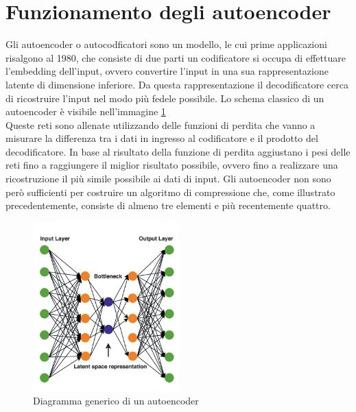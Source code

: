 \section{Funzionamento degli autoencoder}
Gli autoencoder o autocodficatori sono un modello, le cui prime applicazioni risalgono al 1980, che consiste di due parti un codificatore si occupa di effettuare l’embedding dell’input, ovvero convertire l’input in una sua rappresentazione latente di dimensione inferiore. Da questa rappresentazione il decodificatore cerca di ricostruire l’input nel modo più fedele possibile. Lo schema classico di un autoencoder è visibile nell’immagine \ref{fig:modelloAutoencoder}\\
Queste reti sono allenate utilizzando delle funzioni di perdita che vanno a misurare la differenza tra i dati in ingresso al codificatore e il prodotto del decodificatore. In base al risultato della funzione di perdita aggiustano i pesi delle reti fino a raggiungere il miglior risultato possibile, ovvero fino a realizzare una ricostruzione il più simile possibile ai dati di input.
Gli autoencoder non sono però sufficienti per costruire un algoritmo di compressione che, come illustrato precedentemente, consiste di almeno tre elementi e più recentemente quattro.
\newpage
\begin{figure}[!h]
    \centering
    \includegraphics[width=0.5\textwidth]{Immagini/Autoencoder_scheme.png}
    \caption{Diagramma generico di un autoencoder}
    \label{fig:modelloAutoencoder}
\end{figure}

